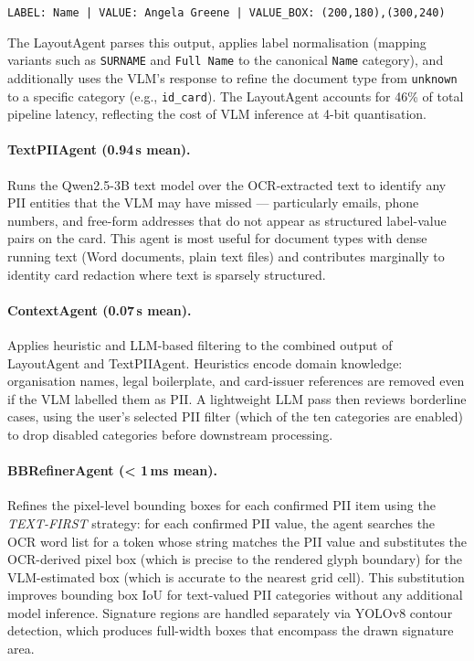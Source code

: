 \documentclass[conference]{IEEEtran}
\begin{document}
\vspace{4pt}
\noindent\texttt{LABEL: Name | VALUE: Angela Greene |
VALUE\_BOX: (200,180),(300,240)}
\vspace{4pt}

The LayoutAgent parses this output, applies label
normalisation (mapping variants such as
\texttt{SURNAME} and \texttt{Full Name} to the
canonical \texttt{Name} category), and additionally
uses the VLM's response to refine the document type
from \texttt{unknown} to a specific category
(e.g., \texttt{id\_card}).
The LayoutAgent accounts for 46\% of total pipeline
latency, reflecting the cost of VLM inference at
4-bit quantisation.

\paragraph{TextPIIAgent (0.94\,s mean).}
Runs the Qwen2.5-3B text model over the OCR-extracted
text to identify any PII entities that the VLM may
have missed --- particularly emails, phone numbers,
and free-form addresses that do not appear as
structured label-value pairs on the card.
This agent is most useful for document types with
dense running text (Word documents, plain text files)
and contributes marginally to identity card redaction
where text is sparsely structured.

\paragraph{ContextAgent (0.07\,s mean).}
Applies heuristic and LLM-based filtering to the
combined output of LayoutAgent and TextPIIAgent.
Heuristics encode domain knowledge: organisation
names, legal boilerplate, and card-issuer references
are removed even if the VLM labelled them as PII.
A lightweight LLM pass then reviews borderline cases,
using the user's selected PII filter (which of the
ten categories are enabled) to drop disabled categories
before downstream processing.

\paragraph{BBRefinerAgent (< 1\,ms mean).}
\label{sec:bbrefiner}
Refines the pixel-level bounding boxes for each
confirmed PII item using the \emph{TEXT-FIRST}
strategy: for each confirmed PII value, the agent
searches the OCR word list for a token whose
string matches the PII value and substitutes the
OCR-derived pixel box (which is precise to the
rendered glyph boundary) for the VLM-estimated box
(which is accurate to the nearest grid cell).
This substitution improves bounding box IoU for
text-valued PII categories without any additional
model inference.
Signature regions are handled separately via YOLOv8
contour detection, which produces full-width boxes
that encompass the drawn signature area.
\end{document}
